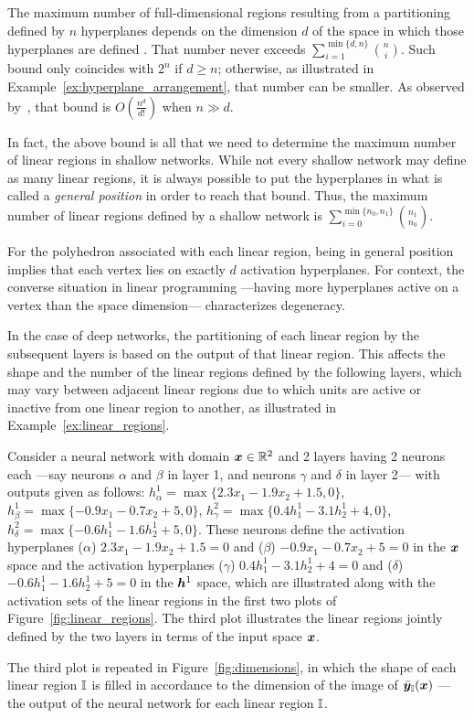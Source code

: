 The maximum number of full-dimensional regions resulting from a partitioning defined by $n$ hyperplanes depends on the dimension $d$ of the space in which those hyperplanes are defined \citep{Zaslavsky1975}. 
That number never exceeds $\sum\limits_{i=1}^{\min\{d,n\}} \binom{n}{i}$. Such bound only coincides with $2^n$ if $d \geq n$; otherwise, as illustrated in Example~\ref{ex:hyperplane_arrangement}, that number can be smaller. 
As observed by~\cite{hanin2019deep}, 
that bound is $O\left( \frac{n^d}{d!} \right)$ when $n \gg d$.

In fact,
the above bound is all that we need to determine the maximum number of linear regions in shallow networks. 
While not every shallow network may define as many linear regions, it is always possible to put the hyperplanes in what is called a \emph{general position} in order to reach that bound. 
Thus, the maximum number of linear regions defined by a shallow network is $\sum\limits_{i=0}^{\min\{n_0,n_1\}} \binom{n_1}{n_0}$.

For the polyhedron associated with each linear region, 
being in general position implies that each vertex lies on exactly $d$ activation hyperplanes. 
For context, 
the converse situation in linear programming ---having more hyperplanes active on a vertex than the space dimension--- characterizes degeneracy. 


In the case of deep networks, the partitioning of each linear region by the subsequent layers is based on the output of that linear region. This affects the shape and the number of the linear regions defined by the following layers, which may vary between adjacent linear regions due to which units are active or inactive from one linear region to another, as illustrated in Example~\ref{ex:linear_regions}. 

\begin{example}\label{ex:linear_regions}
Consider a neural network with domain ${\bm{x}} \in \mathbb{R}^2$ and 2 layers having 2 neurons each ---say neurons $\alpha$ and $\beta$ in layer 1, and neurons $\gamma$ and $\delta$ in layer 2--- with outputs given as follows: 
$h^1_{\alpha} = \max\{ 2.3 x_1 - 1.9 x_2 +1.5, 0\}$, $h^1_{\beta} = \max\{ -0.9 x_1 - 0.7 x_2 +5, 0\}$, 
$h^2_{\gamma} = \max\{ 0.4 h^1_1 - 3.1 h^1_2 +4, 0\}$, $h^2_{\delta} = \max\{ -0.6 h^1_1 - 1.6 h^1_2 +5, 0\}$.
These neurons define the activation hyperplanes ($\alpha$) $2.3 x_1 - 1.9 x_2 +1.5 = 0$ and ($\beta$) $-0.9 x_1 - 0.7 x_2 +5 = 0$ in the ${\bm{x}}$ space 
and the activation hyperplanes ($\gamma$) $0.4 h^1_1 - 3.1 h^1_2 +4 = 0$ and ($\delta$) $-0.6 h^1_1 - 1.6 h^1_2 +5 = 0$ in the ${\bm{h}}^1$ space, 
which are illustrated along with the activation sets of the linear regions in the first two plots of Figure~\ref{fig:linear_regions}. 
The third plot illustrates the linear regions jointly defined by the two layers in terms of the input space ${\bm{x}}$.  

The third plot is repeated in Figure~\ref{fig:dimensions}, in which the shape of each linear region ${\mathbb{I}}$ is filled in accordance to the dimension of the image of $\bar{{\bm{y}}}_{{\mathbb{I}}}({\bm{x}})$ ---the output of the neural network for each linear region ${\mathbb{I}}$.
\end{example}

